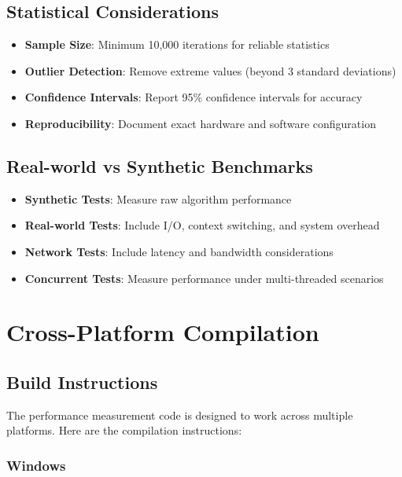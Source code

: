 \documentclass[12pt,a4paper]{article}
\begin{document}
\subsection{Statistical Considerations}

\begin{itemize}
    \item \textbf{Sample Size}: Minimum 10,000 iterations for reliable statistics
    \item \textbf{Outlier Detection}: Remove extreme values (beyond 3 standard deviations)
    \item \textbf{Confidence Intervals}: Report 95\% confidence intervals for accuracy
    \item \textbf{Reproducibility}: Document exact hardware and software configuration
\end{itemize}

\subsection{Real-world vs Synthetic Benchmarks}

\begin{itemize}
    \item \textbf{Synthetic Tests}: Measure raw algorithm performance
    \item \textbf{Real-world Tests}: Include I/O, context switching, and system overhead
    \item \textbf{Network Tests}: Include latency and bandwidth considerations
    \item \textbf{Concurrent Tests}: Measure performance under multi-threaded scenarios
\end{itemize}

\section{Cross-Platform Compilation}

\subsection{Build Instructions}

The performance measurement code is designed to work across multiple platforms. Here are the compilation instructions:

\subsubsection{Windows}
\end{document}
